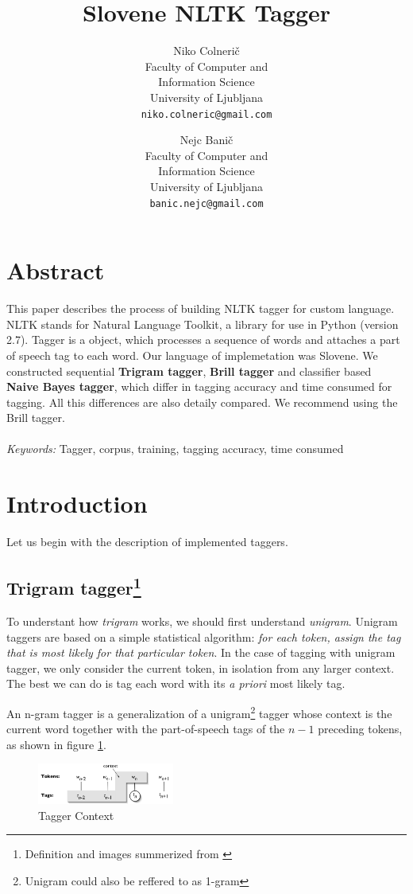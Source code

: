 \documentclass[11pt, conference, compsocconf]{IEEEtran}
\title{Slovene NLTK Tagger}
\author{
	Niko Colnerič \\
	\footnotesize Faculty of Computer and \\
	\footnotesize Information Science \\
	\footnotesize University of Ljubljana \\
	\footnotesize \texttt{niko.colneric@gmail.com} \\
	\and
	Nejc Banič \\
	\footnotesize Faculty of Computer and \\
	\footnotesize Information Science \\
	\footnotesize University of Ljubljana \\
	\footnotesize \texttt{banic.nejc@gmail.com} \\
}
\begin{document}
\maketitle
\thispagestyle{empty}

\section*{Abstract} %
This paper describes the process of building NLTK tagger for custom language. NLTK stands for Natural Language Toolkit, a library for use in Python (version 2.7).
Tagger is a object, which processes a sequence of words and attaches a part of speech tag to each word.
Our language of implemetation was Slovene.
We constructed sequential \textbf{Trigram tagger}, \textbf{Brill tagger} and classifier based \textbf{Naive Bayes tagger}, which differ in tagging accuracy and time consumed for tagging. All this differences are also detaily compared. We recommend using the Brill tagger.
\\\\
\textit{Keywords:} Tagger, corpus, training, tagging accuracy, time consumed

\section{Introduction} %
Let us begin with the description of implemented taggers.

\subsection[Trigram tagger]{Trigram tagger\footnote{Definition and images summerized from \cite{NLTKBOOK}}}
To understant how \textit{trigram} works, we should first understand \textit{unigram}.
Unigram taggers are based on a simple statistical algorithm: \textit{for each token, assign the tag that is most likely for that particular token}.
In the case of tagging with unigram tagger, we only consider the current token, in isolation from any larger context. The best we can do is tag each word with its \textit{a priori} most likely tag.
\par
An n-gram tagger is a generalization of a unigram\footnote{Unigram could also be reffered to as 1-gram} tagger whose context is the current word together with the part-of-speech tags of the $n-1$ preceding tokens, as shown in figure \ref{fig:trigram}.

\begin{figure}[htb]
\begin{center}
\includegraphics[width=0.4\textwidth]{tag-context.png} 
\end{center}
\caption{Tagger Context}
\label{fig:trigram}
\end{figure}
\end{document}
